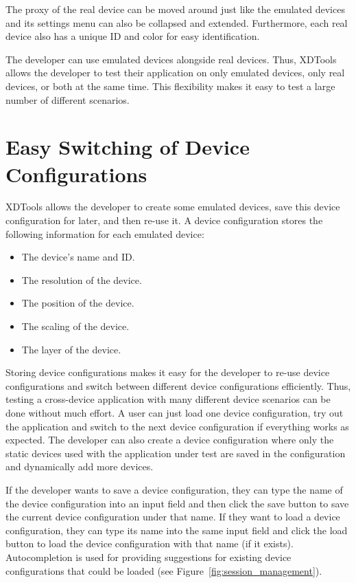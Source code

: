 The proxy of the real device can be moved around just like the emulated devices and its settings menu can also be collapsed and extended. Furthermore, each real device also has a unique ID and color for easy identification.

The developer can use emulated devices alongside real devices. Thus, XDTools allows the developer to test their application on only emulated devices, only real devices, or both at the same time. This flexibility makes it easy to test a large number of different scenarios.

\section{Easy Switching of Device Configurations}

XDTools allows the developer to create some emulated devices, save this device configuration for later, and then re-use it. A device configuration stores the following information for each emulated device:
\begin{itemize}
	\item The device's name and ID.
	\item The resolution of the device.
	\item The position of the device.
	\item The scaling of the device.
	\item The layer of the device.
\end{itemize}
Storing device configurations makes it easy for the developer to re-use device configurations and switch between different device configurations efficiently. Thus, testing a cross-device application with many different device scenarios can be done without much effort. A user can just load one device configuration, try out the application and switch to the next device configuration if everything works as expected. The developer can also create a device configuration where only the static devices used with the application under test are saved in the configuration and dynamically add more devices.

If the developer wants to save a device configuration, they can type the name of the device configuration into an input field and then click the save button to save the current device configuration under that name. If they want to load a device configuration, they can type its name into the same input field and click the load button to load the device configuration with that name (if it exists). Autocompletion is used for providing suggestions for existing device configurations that could be loaded (see Figure~\ref{fig:session_management}). 

